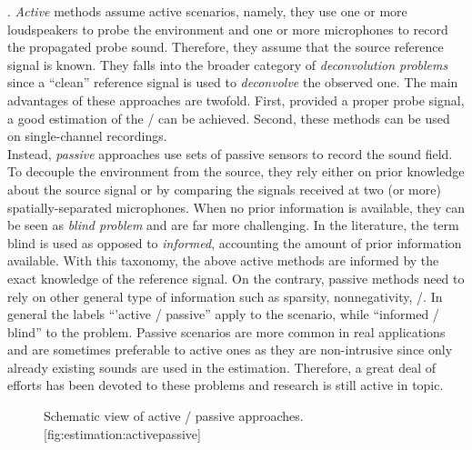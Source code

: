 .
\textit{Active} methods assume active scenarios, namely, they use one or more loudspeakers to probe the environment and one or more microphones to record the propagated probe sound.
Therefore, they assume that the source reference signal is known.
They falls into the broader category of \textit{deconvolution problems} since a ``clean'' reference signal is used to \textit{deconvolve} the observed one.
The main advantages of these approaches are twofold.
First, provided a proper probe signal, a good estimation of the \RIR/ can be achieved.
Second, these methods can be used on single-channel recordings.
\\Instead, \textit{passive} approaches use sets of passive sensors to record the sound field.
To decouple the environment from the source, they rely either on prior knowledge about the source signal or by comparing the signals received at two (or more) spatially-separated microphones.
When no prior information is available, they can be seen as \textit{blind problem} and are far more challenging.
In the literature, the term blind is used as opposed to \textit{informed}, accounting the amount of prior information available.
With this taxonomy, the above active methods are informed by the exact knowledge of the reference signal.
On the contrary, passive methods need to rely on other general type of information such as sparsity, nonnegativity, \etc/.
In general the labels ``'active \vs/ passive'' apply to the scenario, while ``informed \vs/ blind'' to the problem.
Passive scenarios are more common in real applications and are sometimes preferable to active ones as they are non-intrusive since only already existing sounds are used in the estimation.
Therefore, a great deal of efforts has been devoted to these problems and research is still active in topic.

\begin{figure}[h]
    \begin{sidecaption}{%
        Schematic view of active \vs/ passive approaches.
    }[fig:estimation:activepassive]
    \centering
    \resizebox{\linewidth}{!}{
        
    }
    \end{sidecaption}
\end{figure}

